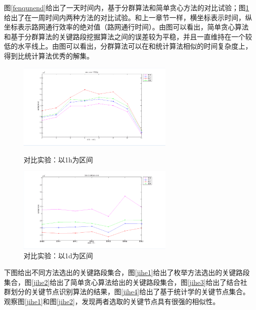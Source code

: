 		图\ref{fenqunend}给出了一天时间内，基于分群算法和简单贪心方法的对比试验；图\ref{end}给出了在一周时间内两种方法的对比试验。和上一章节一样，横坐标表示时间，纵坐标表示路网通行效率的绝对值（路网通行时间）。由图可以看出，简单贪心算法和基于分群算法的关键路段挖掘算法之间的误差较为平稳，并且一直维持在一个较低的水平线上。由图可以看出，分群算法可以在和统计算法相似的时间复杂度上，得到比统计算法优秀的解集。

				\begin{figure}
				\begin{minipage}{0.5\linewidth}
					\centering
					\includegraphics[width=3in]{picture/fenqunend}
					\caption{对比实验：以1h为区间}
					\label{fenqunend}
				\end{minipage}%
				\begin{minipage}{0.5\linewidth}
					\centering
					\includegraphics[width=3in]{picture/end}
					\caption{对比实验：以1d为区间}
					\label{end}
				\end{minipage}
				\end{figure}

		下图给出不同方法选出的关键路段集合，图\ref{jihe1}给出了枚举方法选出的关键路段集合，图\ref{jihe2}给出了简单贪心算法给出的关键路段集合，图\ref{jihe3}给出了结合社群划分的关键节点识别算法的结果，图\ref{jihe4}给出了基于统计学的关键节点集合。观察图\ref{jihe1}和图\ref{jihe2}，发现两者选取的关键节点具有很强的相似性。

